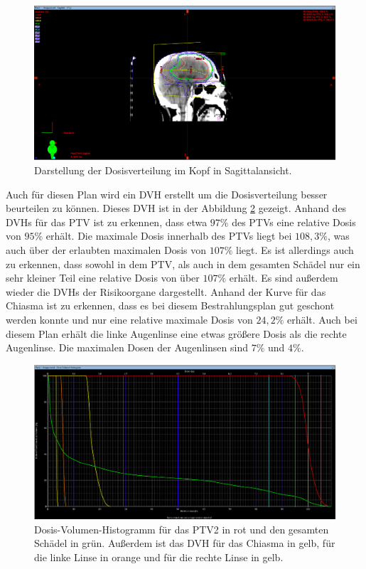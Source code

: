 \begin{figure}[H]
  \centering
  \includegraphics[width=\textwidth]{Bilder/Teilhirn2_X.png}
  \caption{Darstellung der Dosisverteilung im Kopf in Sagittalansicht.}
  \label{abb:X2}
\end{figure}

Auch für diesen Plan wird ein DVH erstellt um die Dosisverteilung besser beurteilen zu können.
Dieses DVH ist in der Abbildung \ref{abb:DVH2} gezeigt. Anhand des DVHs für das PTV ist zu erkennen, dass
etwa $97\%$ des PTVs eine relative Dosis von $95\%$ erhält. Die maximale Dosis innerhalb des PTVs liegt bei $108,3\%$, was auch über der erlaubten
maximalen Dosis von $107\%$ liegt. Es ist allerdings auch zu erkennen, dass sowohl in dem PTV, als auch in dem gesamten Schädel nur ein sehr kleiner
Teil eine relative Dosis von über $107\%$ erhält. Es sind außerdem wieder die DVHs der Risikoorgane dargestellt.
Anhand der Kurve für das Chiasma ist zu erkennen, dass es bei diesem Bestrahlungsplan gut geschont werden konnte und nur eine relative maximale
Dosis von $24,2\%$ erhält. Auch bei diesem Plan erhält die linke Augenlinse eine etwas größere Dosis als die rechte Augenlinse. Die maximalen Dosen
der Augenlinsen sind $7\%$ und $4\%$.

\begin{figure}[H]
  \centering
  \includegraphics[width=\textwidth]{Bilder/Teilhirn2_DVH.png}
  \caption{Dosis-Volumen-Histogramm für das PTV2 in rot und den gesamten Schädel in grün. Außerdem ist das DVH für das Chiasma in gelb, für die linke Linse in orange und für die rechte Linse in gelb.}
  \label{abb:DVH2}
\end{figure}


